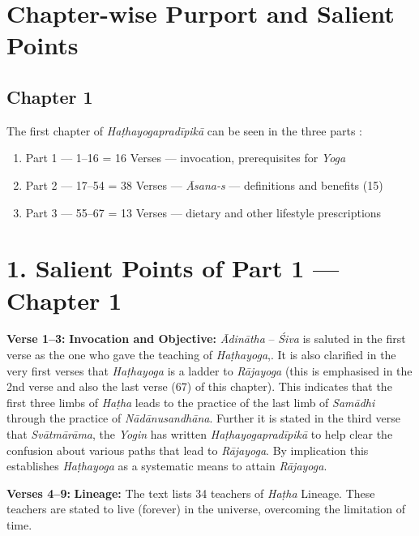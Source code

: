 \section*{Chapter-wise Purport and Salient Points}

\subsection*{Chapter 1}

The first chapter of \textit{Haṭhayogapradīpikā} can be seen in the three parts :

\begin{enumerate}
\itemsep=0pt
\renewcommand{\theenumi}{\arabic{enumi}}
\renewcommand{\labelenumi}{\theenumi)}
\item Part 1 --- 1--16      =  16 Verses --- invocation, prerequisites for \textit{Yoga} 
\item Part 2 --- 17--54    =  38 Verses --- \textit{Āsana-s} --- definitions and benefits (15)
\item Part 3 --- 55--67    =  13 Verses --- dietary and other lifestyle prescriptions
\end{enumerate}

\section*{1. Salient Points of Part 1 --- Chapter 1}

\textbf{Verse 1--3:}  \textbf{Invocation and Objective:} \textit{Ādinātha} –  \textit{Śiva} is saluted in the first verse as the one who gave the teaching of \textit{Haṭhayoga},. It is also clarified in the very first verses that \textit{Haṭhayoga}  is a ladder to \textit{Rājayoga} (this is emphasised in the 2nd verse and also the last verse (67)  of this chapter). This indicates that the first three limbs of \textit{Haṭha} leads to the practice of the last limb of \textit{Samādhi} through the practice of \textit{\textit{Nādānusandhāna}}. Further it is stated in the third verse that \textit{Svātmārāma}, the \textit{Yogin} has written \textit{Haṭhayogapradīpikā} to help clear the confusion about various paths that lead to \textit{Rājayoga}. By implication this establishes \textit{Haṭhayoga}  as a systematic means to attain \textit{Rājayoga}.

\textbf{Verses  4--9:} \textbf{Lineage:} The text lists 34 teachers of \textit{Haṭha} Lineage. These teachers are stated to live (forever) in the universe, overcoming the limitation of time.

